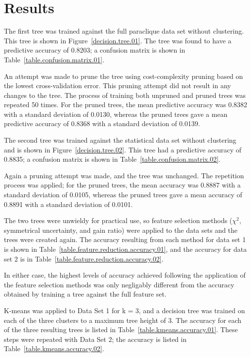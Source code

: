 \documentclass[conference,compsoc]{IEEEtran}
\begin{document}
\section{Results}

The first tree was trained against the full paraclique data set without clustering. This tree is shown in Figure~\ref{decision.tree.01}.
The tree was found to have a predictive accuracy of 0.8203; a confusion matrix is shown in Table~\ref{table.confusion.matrix.01}.

An attempt was made to prune the tree using cost-complexity pruning based on the lowest cross-validation error. This pruning attempt did not result in
any changes to the tree. The process of training both unpruned and pruned trees was repeated 50 times. For the pruned trees, 
the mean predictive accuracy was 0.8382 with a standard deviation of 0.0130, whereas
the pruned trees gave a mean predictive accuracy of 0.8368 with a standard deviation of 0.0139.

The second tree was trained against the statistical data set without clustering and is shown in Figure~\ref{decision.tree.02}. This tree
had a predictive accuracy of 0.8835; a confusion matrix is shown in Table~\ref{table.confusion.matrix.02}.

Again a pruning attempt was made, and the tree was unchanged. The repetition process was applied; for the pruned trees, the mean accuracy was 0.8887 
with a standard deviation of 0.0105,
whereas the pruned trees gave a mean accuracy of 0.8891 with a standard deviation of 0.0101.

The two trees were unwieldy for practical use, so feature selection methods (${\chi}^2$, symmetrical uncertainty, and gain ratio) were applied to the data sets
and the trees were created again. The accuracy resulting from each method for data set 1 is shown in Table~\ref{table.feature.reduction.accuracy.01},
and the accuracy for data set 2 is in Table~\ref{table.feature.reduction.accuracy.02}.

In either case, the highest levels of accuracy achieved following the application of the feature selection methods was only negligably different
from the accuracy obtained by training a tree against the full feature set.

K-means was applied to Data Set 1 for k = 3, and a decision tree was trained on each of the three clusters to a maximum tree height of 3. 
The accuracy for each of the three resulting trees is listed in Table~\ref{table.kmeans.accuracy.01}.
These steps were repeated with Data Set 2; the accuracy is listed in Table~\ref{table.kmeans.accuracy.02}.
\end{document}
